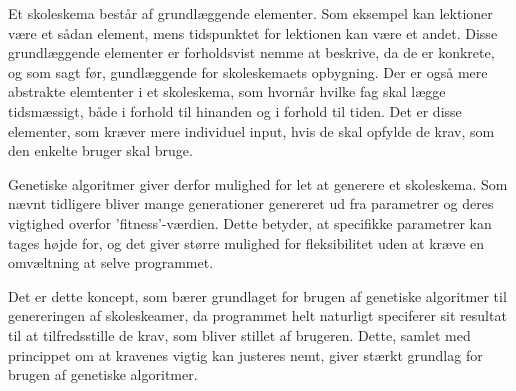 Et skoleskema består af grundlæggende elementer. Som eksempel kan lektioner være et sådan element, mens tidspunktet for lektionen kan være et andet. Disse grundlæggende elementer er forholdsvist nemme at beskrive, da de er konkrete, og som sagt før, gundlæggende for skoleskemaets opbygning. Der er også mere abstrakte elemtenter i et skoleskema, som hvornår hvilke fag skal lægge tidsmæssigt, både i forhold til hinanden og i forhold til tiden. Det er disse elementer, som kræver mere individuel input, hvis de skal opfylde de krav, som den enkelte bruger skal bruge.

Genetiske algoritmer giver derfor mulighed for let at generere et skoleskema. Som nævnt tidligere bliver mange generationer genereret ud fra parametrer og deres vigtighed overfor 'fitness'-værdien. Dette betyder, at specifikke parametrer kan tages højde for, og det giver større mulighed for fleksibilitet uden at kræve en omvæltning at selve programmet. 

Det er dette koncept, som bærer grundlaget for brugen af genetiske algoritmer til genereringen af skoleskeamer, da programmet helt naturligt speciferer sit resultat til at tilfredsstille de krav, som bliver stillet af brugeren. Dette, samlet med princippet om at kravenes vigtig kan justeres nemt, giver stærkt grundlag for brugen af genetiske algoritmer.


